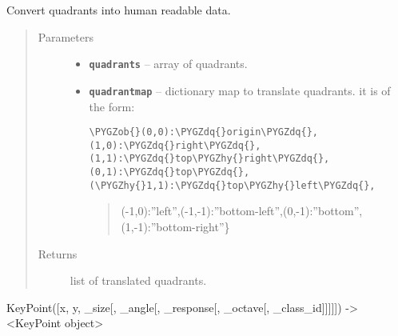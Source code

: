 \documentclass[letterpaper,10pt,english]{sphinxmanual}
\def\PYGZob{\char`\{}
\def\PYGZhy{\char`\-}
\def\PYGZdq{\char`\"}
\begin{document}

\begin{fulllineitems}
\label{RRtoolbox.lib.arrayops:RRtoolbox.lib.arrayops.convert.translateQuadrants}
Convert quadrants into human readable data.
\begin{quote}\begin{description}
\item[{Parameters}] \leavevmode\begin{itemize}
\item {} 
\textbf{\texttt{quadrants}} -- array of quadrants.

\item {} 
\textbf{\texttt{quadrantmap}} -- 
dictionary map to translate quadrants. it is of the form:

\begin{Verbatim}[commandchars=\\\{\}]
\PYGZob{}(0,0):\PYGZdq{}origin\PYGZdq{},(1,0):\PYGZdq{}right\PYGZdq{},(1,1):\PYGZdq{}top\PYGZhy{}right\PYGZdq{},(0,1):\PYGZdq{}top\PYGZdq{},(\PYGZhy{}1,1):\PYGZdq{}top\PYGZhy{}left\PYGZdq{},
\end{Verbatim}
\begin{quote}

(-1,0):''left'',(-1,-1):''bottom-left'',(0,-1):''bottom'',(1,-1):''bottom-right''\}
\end{quote}


\end{itemize}

\item[{Returns}] \leavevmode
list of translated quadrants.

\end{description}\end{quote}

\end{fulllineitems}


\begin{fulllineitems}
\label{RRtoolbox.lib.arrayops:RRtoolbox.lib.arrayops.convert.tuple2keyPoint}
KeyPoint({[}x, y, \_size{[}, \_angle{[}, \_response{[}, \_octave{[}, \_class\_id{]}{]}{]}{]}{]}) -\textgreater{} \textless{}KeyPoint object\textgreater{}

\end{fulllineitems}
\end{document}
